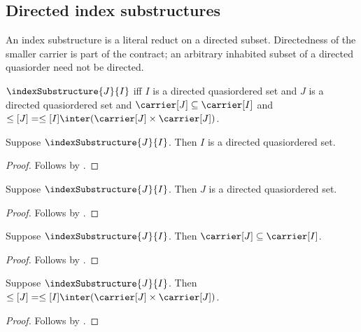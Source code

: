 \subsection{Directed index substructures}

An index substructure is a literal reduct on a directed subset.  Directedness
of the smaller carrier is part of the contract; an arbitrary inhabited subset
of a directed quasiorder need not be directed.

\begin{definition}\label{index_substructure}
    $\indexSubstructure{J}{I}$ iff
        $I$ is a directed quasiordered set and
        $J$ is a directed quasiordered set and
        $\carrier[J]\subseteq\carrier[I]$ and
        $\leq[J]=\leq[I]\inter
            (\carrier[J]\times\carrier[J])$.
\end{definition}

\begin{proposition}\label{index_substructure_ambient}
    Suppose $\indexSubstructure{J}{I}$.
    Then $I$ is a directed quasiordered set.
\end{proposition}
\begin{proof}
    Follows by .
\end{proof}

\begin{proposition}\label{index_substructure_is_directed}
    Suppose $\indexSubstructure{J}{I}$.
    Then $J$ is a directed quasiordered set.
\end{proposition}
\begin{proof}
    Follows by .
\end{proof}

\begin{proposition}\label{index_substructure_carrier_subseteq}
    Suppose $\indexSubstructure{J}{I}$.
    Then $\carrier[J]\subseteq\carrier[I]$.
\end{proposition}
\begin{proof}
    Follows by .
\end{proof}

\begin{proposition}\label{index_substructure_order_reduct}
    Suppose $\indexSubstructure{J}{I}$.
    Then $\leq[J]=\leq[I]\inter
        (\carrier[J]\times\carrier[J])$.
\end{proposition}
\begin{proof}
    Follows by .
\end{proof}

